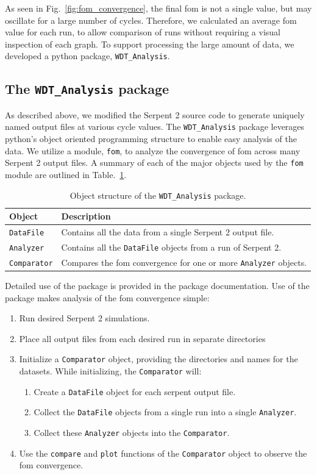 As seen in Fig.~\ref{fig:fom_convergence}, the final \gls{fom} is not
a single value, but may oscillate for a large number of
cycles. Therefore, we calculated an average \gls{fom} value for each
run, to allow comparison of runs without requiring a visual inspection
of each graph. To support processing the large amount of data, we
developed a python package, \verb|WDT_Analysis|.

\subsection{The \texttt{WDT\_Analysis} package}
\label{sec:wdt_analysis}

As described above, we modified the Serpent 2 source code to generate
uniquely named output files at various cycle values. The
\verb|WDT_Analysis| package leverages python's object oriented
programming structure to enable easy analysis of the data. We utilize
a module, \verb|fom|, to analyze the convergence of \gls{fom} across
many Serpent 2 output files. A summary
of each of the major objects used by the \verb|fom| module are outlined in
Table.~\ref{tab:wdt_analysis}.
\begin{table}[hbtp]
  \centering
  \caption{Object structure of the \texttt{WDT\_Analysis} package.\label{tab:wdt_analysis}}
  \begin{tabular}{ll} \toprule
   \textbf{Object} & \textbf{Description} \\ \midrule
    \verb|DataFile| & Contains all the data from a single Serpent 2
                      output file. \\
    \verb|Analyzer| & Contains all the \verb|DataFile| objects
                       from a run of Serpent 2. \\
    \verb|Comparator| & Compares the \gls{fom} convergence for one or
                        more \verb|Analyzer| objects. \\
    \bottomrule
  \end{tabular}
\end{table}
Detailed use of the package is provided in the package
documentation. Use of the package makes analysis of the \gls{fom}
convergence simple:
\begin{enumerate}
\item Run desired Serpent 2 simulations.
\item Place all output files from each desired run in separate directories
\item Initialize a \verb|Comparator| object, providing the directories
  and names for the datasets. While initializing, the
  \verb|Comparator| will:
  \begin{enumerate}
  \item Create a \verb|DataFile| object for each serpent output file.
  \item Collect the \verb|DataFile| objects from a single run into a single
    \verb|Analyzer|.
  \item Collect these \verb|Analyzer| objects into the
    \verb|Comparator|.
  \end{enumerate}
\item Use the \verb|compare| and \verb|plot| functions of the
  \verb|Comparator| object to observe the \gls{fom} convergence.
\end{enumerate}
